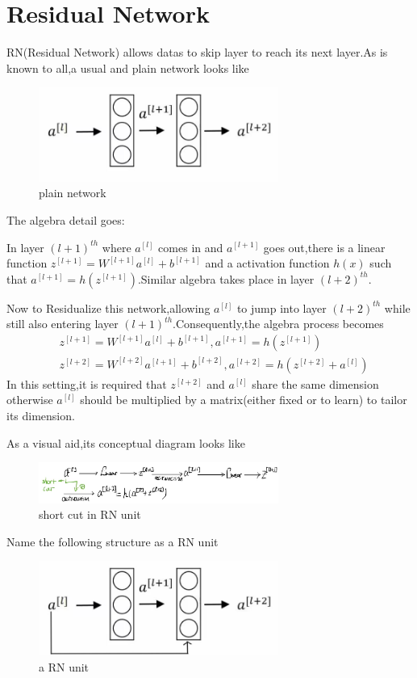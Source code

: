 \documentclass{article}
\begin{document}
\section{Residual Network}
RN(Residual Network) allows datas to skip layer to reach its next layer.As is known to all,a usual and plain network looks like
\begin{figure}[htbp]
	\centering
	\includegraphics[width=0.7\textwidth]{8.jpg}
	\caption{plain network}
\end{figure}
The algebra detail goes:
\par In layer $(l+1)^{th}$  where $a^{[l]}$ comes in and $a^{[l+1]}$ goes out,there is a linear function $z^{[l+1]}=W^{[l+1]}a^{[l]}+b^{[l+1]}$ and a activation function $h(x)$ such that $a^{[l+1]}=h(z^{[l+1]})$.Similar algebra takes place in layer $(l+2)^{th}$.
\par Now to Residualize this network,allowing $a^{[l]}$ to jump into layer $(l+2)^{th}$ while still also entering layer $(l+1)^{th}$.Consequently,the algebra process becomes
\begin{align*}
	&z^{[l+1]}=W^{[l+1]}a^{[l]}+b^{[l+1]},a^{[l+1]}=h(z^{[l+1]})\\
	&z^{[l+2]}=W^{[l+2]}a^{[l+1]}+b^{[l+2]},a^{[l+2]}=h(z^{[l+2]}+a^{[l]})
\end{align*}
In this setting,it is required that $z^{[l+2]}$ and $a^{[l]}$ share the same dimension otherwise $a^{[l]}$ should be multiplied by a matrix(either fixed or to learn) to tailor its dimension.
\vspace{0.4\textheight}
\par As a visual aid,its conceptual diagram looks like
\begin{figure}[htbp]
	\centering
	\includegraphics[width=0.7\textwidth]{9.jpg}
	\caption{short cut in RN unit}
\end{figure}
\par Name the following structure as a RN unit
\begin{figure}[htbp]
	\centering
	\includegraphics[width=0.7\textwidth]{10.jpg}
	\caption{a RN unit}
\end{figure}
\end{document}
